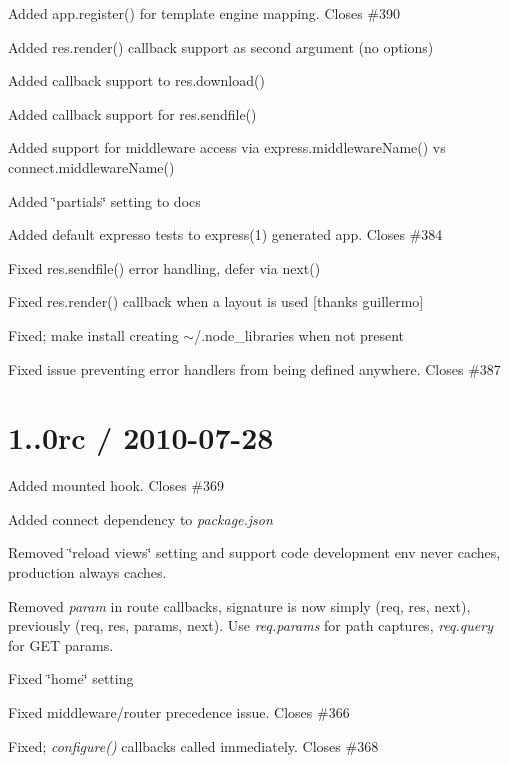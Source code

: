 {\ttfamily }

{\ttfamily 
\begin{DoxyItemize}
\item Added {\ttfamily app.\+register()} for template engine mapping. Closes \#390
\item Added {\ttfamily res.\+render()} callback support as second argument (no options)
\item Added callback support to {\ttfamily res.\+download()}
\item Added callback support for {\ttfamily res.\+sendfile()}
\item Added support for middleware access via {\ttfamily express.\+middleware\+Name()} vs {\ttfamily connect.\+middleware\+Name()}
\item Added \char`\"{}partials\char`\"{} setting to docs
\item Added default expresso tests to {\ttfamily express(1)} generated app. Closes \#384
\item Fixed {\ttfamily res.\+sendfile()} error handling, defer via {\ttfamily next()}
\item Fixed {\ttfamily res.\+render()} callback when a layout is used \mbox{[}thanks guillermo\mbox{]}
\item Fixed; {\ttfamily make install} creating $\sim$/.node\+\_\+libraries when not present
\item Fixed issue preventing error handlers from being defined anywhere. Closes \#387
\end{DoxyItemize}}

{\ttfamily \section*{1..\+0rc / 2010-\/07-\/28 }}

{\ttfamily }

{\ttfamily 
\begin{DoxyItemize}
\item Added mounted hook. Closes \#369
\item Added connect dependency to {\itshape package.\+json}
\item Removed \char`\"{}reload views\char`\"{} setting and support code development env never caches, production always caches.
\item Removed {\itshape param} in route callbacks, signature is now simply (req, res, next), previously (req, res, params, next). Use {\itshape req.\+params} for path captures, {\itshape req.\+query} for G\+ET params.
\item Fixed \char`\"{}home\char`\"{} setting
\item Fixed middleware/router precedence issue. Closes \#366
\item Fixed; {\itshape configure()} callbacks called immediately. Closes \#368
\end{DoxyItemize}}

